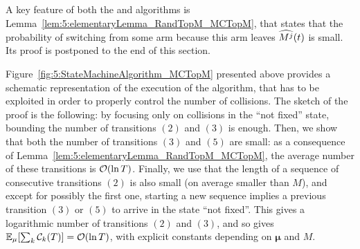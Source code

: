 \begin{smallproof}
  A key feature of both the \RandTopM{} and \MCTopM{} algorithms is Lemma~\ref{lem:5:elementaryLemma_RandTopM_MCTopM}, that states that the probability of switching from some arm because this arm leaves $\widehat{M^j}(t)$ is small. Its proof is postponed to the end of this section.


  Figure~\ref{fig:5:StateMachineAlgorithm_MCTopM} presented above provides a schematic representation of the execution of the \MCTopM{} algorithm, that has to be exploited in order to properly control the number of collisions.
  The sketch of the proof is the following: by focusing only on collisions in the ``not fixed'' state, bounding the number of transitions $(2)$ and $(3)$ is enough.
  Then, we show that both the number of transitions $(3)$ and $(5)$ are small: as a consequence of Lemma~\ref{lem:5:elementaryLemma_RandTopM_MCTopM}, the average number of these transitions is $\mathop{}\mathopen{}\mathcal{O}\mathopen{}\left(\ln T\right)$.
  Finally, we use that the length of a sequence of consecutive transitions $(2)$ is also small (on average smaller than $M$), and except for possibly the first one, starting a new sequence implies a previous transition $(3)$ or $(5)$ to arrive in the state ``not fixed''. This gives a logarithmic number of transitions $(2)$ and $(3)$, and so gives $\mathbb{E}_{\mu}[\sum_k\mathcal{C}_k(T)] = \mathop{}\mathopen{}\mathcal{O}\mathopen{}\left(\ln T\right)$,
  with explicit constants depending on $\boldsymbol{\mu}$ and $M$.



\end{smallproof}

